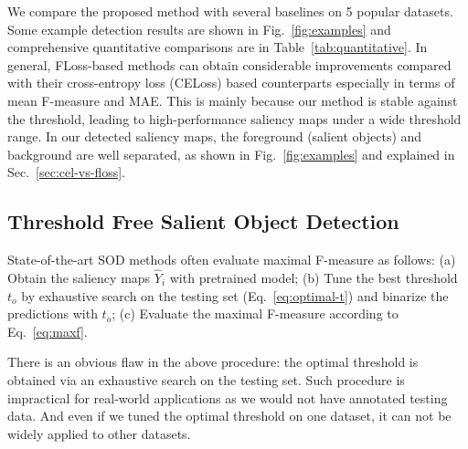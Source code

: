 \documentclass[10pt,twocolumn,letterpaper]{article}
\begin{document}
We compare the proposed method with several baselines on 5 popular datasets.
%
Some example detection results are shown in Fig.~\ref{fig:examples} and
comprehensive quantitative comparisons are in Table~\ref{tab:quantitative}.
%
In general, FLoss-based methods can obtain considerable improvements compared with
their cross-entropy loss (CELoss) based counterparts
especially in terms of mean F-measure and MAE.
%
This is mainly because our method is stable against the threshold, leading to
high-performance saliency maps under a wide threshold range.
%
In our detected saliency maps, the foreground (salient objects) and background are well separated,
as shown in Fig.~\ref{fig:examples} and explained in Sec.~\ref{sec:cel-vs-floss}.


\subsection{Threshold Free Salient Object Detection}\label{sec:thres-free}

State-of-the-art SOD methods \cite{hou2017deeply,li2016deep,liu2016dhsnet,zhang2017amulet} 
often evaluate maximal F-measure as follows:
(a) Obtain the saliency maps $\hat{Y}_i$ with pretrained model;
(b) Tune the best threshold $t_o$ by exhaustive search on the testing set (Eq.~\ref{eq:optimal-t})
and binarize the predictions with $t_o$;
(c) Evaluate the maximal F-measure according to Eq.~\ref{eq:maxf}.
%
%
%
%


There is an obvious flaw in the above procedure:
the optimal threshold is obtained via an exhaustive search on the testing set.
%
Such procedure is impractical for real-world applications as we would 
not have annotated testing data.
%
And even if we tuned the optimal threshold on one dataset, it can not be widely applied
to other datasets.
\end{document}
